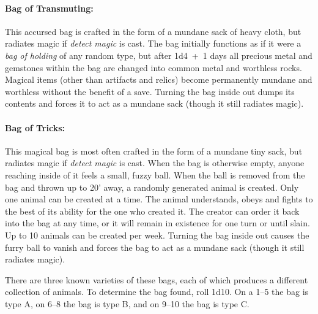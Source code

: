 \begin{multicols}{2}
\paragraph{Bag of Transmuting:} This accursed bag is crafted in the form of a mundane sack of heavy cloth, but radiates magic if \textit{detect magic} is cast.  The bag initially functions as if it were a \textit{bag of holding} of any random type, but after 1d4~+~1 days all precious metal and gemstones within the bag are changed into common metal and worthless rocks.  Magical items (other than artifacts and relics) become permanently mundane and worthless without the benefit of a save.  Turning the bag inside out dumps its contents and forces it to act as a mundane sack (though it still radiates magic).

\paragraph{Bag of Tricks:} This magical bag is most often crafted in the form of a mundane tiny sack, but radiates magic if \textit{detect magic} is cast.  When the bag is otherwise empty, anyone reaching inside of it feels a small, fuzzy ball.  When the ball is removed from the bag and thrown up to 20' away, a randomly generated animal is created.  Only one animal can be created at a time.  The animal understands, obeys and fights to the best of its ability for the one who created it.  The creator can order it back into the bag at any time, or it will remain in existence for one turn or until slain.  Up to 10 animals can be created per week.  Turning the bag inside out causes the furry ball to vanish and forces the bag to act as a mundane sack (though it still radiates magic).  

There are three known varieties of these bags, each of which produces a different collection of animals.  To determine the bag found, roll 1d10.  On a 1--5 the bag is type A, on 6--8 the bag is type B, and on 9--10 the bag is type C.

\end{multicols}

